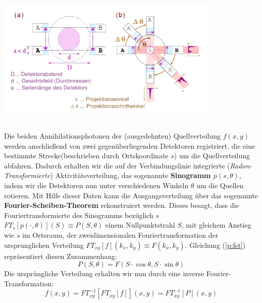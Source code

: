 	\minipanf
		\begin{center}
			\includegraphics[width=0.8\textwidth, height=0.3\textheight]{pic/PET-Prinzip.png}
			\label{PET-Prinzip}
		\end{center}
	\minipend 
	\hspace{3mm}
	\ \\	
	Die beiden Annihilationsphotonen der (ausgedehnten) Quellverteilung $f(x,y)$ werden anschließend von zwei gegenüberliegenden Detektoren registriert, die eine bestimmte Strecke(beschrieben durch Ortskoordinate $s$) um die Quellverteilung abfahren. Dadurch erhalten wir die auf der Verbindungslinie integrierte (\textit{Radon-Transformierte}) Aktivitätsverteilung, das sogenannte \textbf{Sinogramm $p(s,\theta)$}, indem wir die Detektoren nun unter verschiedenen Winkeln $\theta$ um die Quellen rotieren. Mit Hilfe dieser Daten kann die Ausgangsverteilung über das sogenannte \textbf{Fourier-Scheiben-Theorem} rekonstruiert werden. Dieses besagt, dass die Fouriertransformierte des Sinogramms bezüglich $s$ $FT_s[p(\cdot,\theta)](S)\equiv P(S,\theta)$ einem Nullpunktstrahl $S$, mit gleichem Anstieg wie $s$ im Ortsraum, der zweidimensionalen Fouriertransformation der ursprunglichen Verteilung $FT_{xy}[f] (k_x, k_y)\equiv F(k_x,k_y)$. Gleichung (\ref{p:fst}) repräsentiert diesen Zusammenhang:
	\begin{equation}\label{p:fst}
		P(S,\theta) = F(S\cdot \cos\theta, S\cdot \sin\theta)
	\end{equation}
	Die ursprüngliche Verteilung erhalten wir nun durch eine inverse Fourier-Transformation:
	\begin{equation*}
		f(x,y) = FT^{-1}_{xy}[FT_{xy}[f]](x,y) =  FT^{-1}_{xy}[P](x,y)
	\end{equation*}	
	
